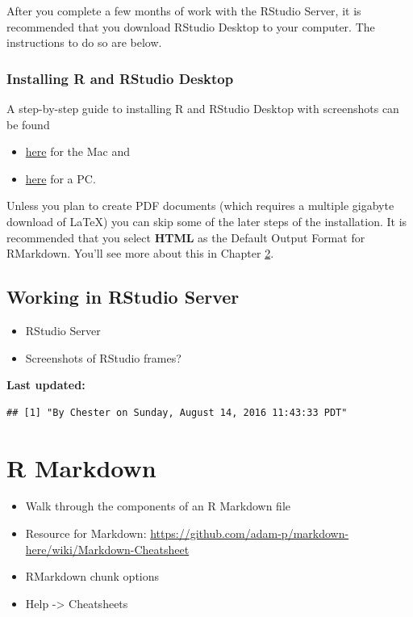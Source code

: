 \documentclass[]{tufte-book}
\providecommand{\tightlist}{%
  \setlength{\itemsep}{0pt}\setlength{\parskip}{0pt}}
\begin{document}
After you complete a few months of work with the RStudio Server, it is
recommended that you download RStudio Desktop to your computer. The
instructions to do so are below.

\subsection{Installing R and RStudio
Desktop}\label{installing-r-and-rstudio-desktop}

A step-by-step guide to installing R and RStudio Desktop with
screenshots can be found

\begin{itemize}
\tightlist
\item
  \href{http://www.reed.edu/data-at-reed/software/R/r_studio.html}{here}
  for the Mac and
\item
  \href{http://www.reed.edu/data-at-reed/software/R/r_studio_pc.html}{here}
  for a PC.
\end{itemize}

Unless you plan to create PDF documents (which requires a multiple
gigabyte download of LaTeX) you can skip some of the later steps of the
installation. It is recommended that you select \textbf{HTML} as the
Default Output Format for RMarkdown. You'll see more about this in
Chapter \ref{rmarkdown}.

\section{Working in RStudio Server}\label{working-in-rstudio-server}

\begin{itemize}
\tightlist
\item
  RStudio Server
\item
  Screenshots of RStudio frames?
\end{itemize}

\textbf{Last updated:}

\begin{verbatim}
## [1] "By Chester on Sunday, August 14, 2016 11:43:33 PDT"
\end{verbatim}

\chapter{R Markdown}\label{rmarkdown}

\begin{itemize}
\tightlist
\item
  Walk through the components of an R Markdown file
\item
  Resource for Markdown:
  \url{https://github.com/adam-p/markdown-here/wiki/Markdown-Cheatsheet}
\item
  RMarkdown chunk options
\item
  Help -\textgreater{} Cheatsheets
\end{itemize}
\end{document}
